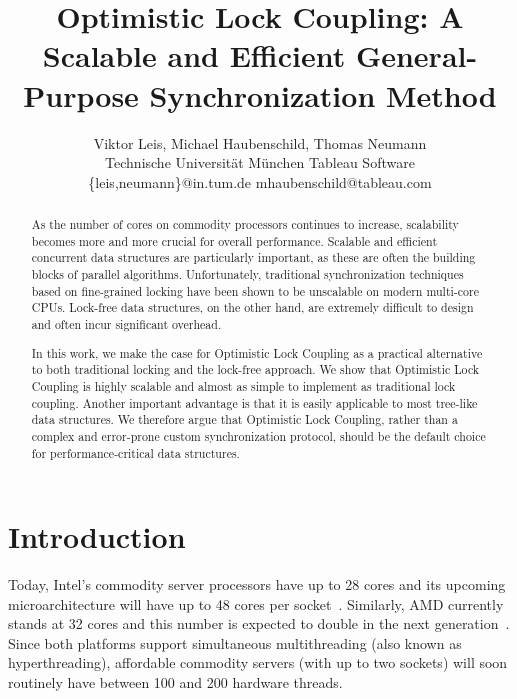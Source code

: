 \documentclass[11pt]{article}
\begin{document}
\title{Optimistic Lock Coupling: A Scalable and Efficient General-Purpose Synchronization Method}

\author{Viktor Leis, Michael Haubenschild\raisebox{0.9ex}{$\ast$}, Thomas Neumann\\ Technische Universit{\"a}t M{\"u}nchen \hspace{0.7cm} Tableau Software\raisebox{0.9ex}{$\ast$} \\ {\{leis,neumann\}{@}in.tum.de} \hspace{0.7cm} {mhaubenschild{@}tableau.com\raisebox{0.9ex}{$\ast$}}}

\maketitle

\begin{abstract}
As the number of cores on commodity processors continues to increase, scalability becomes more and more crucial for overall performance.
Scalable and efficient concurrent data structures are particularly important, as these are often the building blocks of parallel algorithms.
Unfortunately, traditional synchronization techniques based on fine-grained locking have been shown to be unscalable on modern multi-core CPUs.
Lock-free data structures, on the other hand, are extremely difficult to design and often incur significant overhead.

In this work, we make the case for Optimistic Lock Coupling as a practical alternative to both traditional locking and the lock-free approach.
We show that Optimistic Lock Coupling is highly scalable and almost as simple to implement as traditional lock coupling.
Another important advantage is that it is easily applicable to most tree-like data structures.
We therefore argue that Optimistic Lock Coupling, rather than a complex and error-prone custom synchronization protocol, should be the default choice for performance-critical data structures.
\end{abstract}

\section{Introduction}

Today, Intel's commodity server processors have up to 28 cores and its upcoming microarchitecture will have up to 48 cores per socket~\cite{intel}.
Similarly, AMD currently stands at 32 cores and this number is expected to double in the next generation~\cite{amd}.
Since both platforms support simultaneous multithreading (also known as hyperthreading), affordable commodity servers (with up to two sockets) will soon routinely have between 100 and 200 hardware threads.
\end{document}
